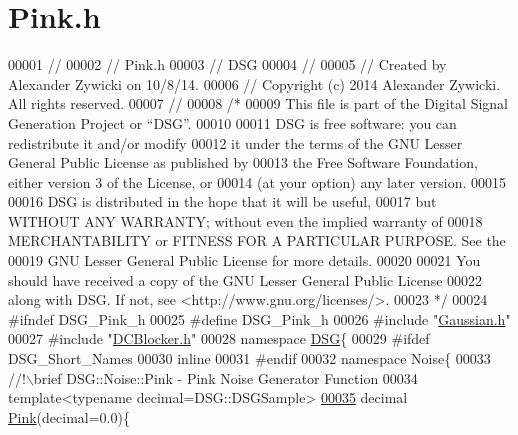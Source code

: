 \hypertarget{_pink_8h_source}{\section{Pink.\+h}
\label{_pink_8h_source}
}

\begin{DoxyCode}
00001 \textcolor{comment}{//}
00002 \textcolor{comment}{//  Pink.h}
00003 \textcolor{comment}{//  DSG}
00004 \textcolor{comment}{//}
00005 \textcolor{comment}{//  Created by Alexander Zywicki on 10/8/14.}
00006 \textcolor{comment}{//  Copyright (c) 2014 Alexander Zywicki. All rights reserved.}
00007 \textcolor{comment}{//}
00008 \textcolor{comment}{/*}
00009 \textcolor{comment}{ This file is part of the Digital Signal Generation Project or “DSG”.}
00010 \textcolor{comment}{}
00011 \textcolor{comment}{ DSG is free software: you can redistribute it and/or modify}
00012 \textcolor{comment}{ it under the terms of the GNU Lesser General Public License as published by}
00013 \textcolor{comment}{ the Free Software Foundation, either version 3 of the License, or}
00014 \textcolor{comment}{ (at your option) any later version.}
00015 \textcolor{comment}{}
00016 \textcolor{comment}{ DSG is distributed in the hope that it will be useful,}
00017 \textcolor{comment}{ but WITHOUT ANY WARRANTY; without even the implied warranty of}
00018 \textcolor{comment}{ MERCHANTABILITY or FITNESS FOR A PARTICULAR PURPOSE.  See the}
00019 \textcolor{comment}{ GNU Lesser General Public License for more details.}
00020 \textcolor{comment}{}
00021 \textcolor{comment}{ You should have received a copy of the GNU Lesser General Public License}
00022 \textcolor{comment}{ along with DSG.  If not, see <http://www.gnu.org/licenses/>.}
00023 \textcolor{comment}{ */}
00024 \textcolor{preprocessor}{#ifndef DSG\_Pink\_h}
00025 \textcolor{preprocessor}{#define DSG\_Pink\_h}
00026 \textcolor{preprocessor}{#include "\hyperlink{_gaussian_8h}{Gaussian.h}"}
00027 \textcolor{preprocessor}{#include "\hyperlink{_d_c_blocker_8h}{DCBlocker.h}"}
00028 \textcolor{keyword}{namespace }\hyperlink{namespace_d_s_g}{DSG}\{
00029 \textcolor{preprocessor}{#ifdef DSG\_Short\_Names}
00030     \textcolor{keyword}{inline}
00031 \textcolor{preprocessor}{#endif}
00032     \textcolor{keyword}{namespace }Noise\{\textcolor{comment}{}
00033 \textcolor{comment}{        //!\(\backslash\)brief DSG::Noise::Pink - Pink Noise Generator Function}
00034 \textcolor{comment}{}        \textcolor{keyword}{template}<\textcolor{keyword}{typename} decimal=DSG::DSGSample>
\hypertarget{_pink_8h_source_l00035}{}\hyperlink{namespace_d_s_g_1_1_noise_a9f0bab677a7602a8e0d40e040de8c8b2}{00035}         decimal \hyperlink{namespace_d_s_g_1_1_noise_a9f0bab677a7602a8e0d40e040de8c8b2}{Pink}(decimal=0.0)\{

\end{DoxyCode}

